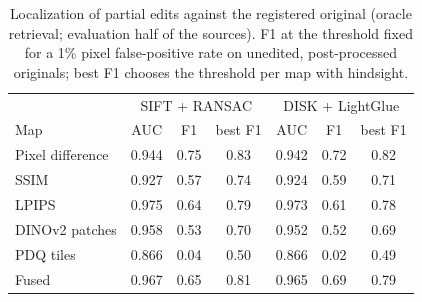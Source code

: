 \begin{table}[!t]
\centering
\footnotesize
\caption{Localization of partial edits against the registered original (oracle retrieval; evaluation half of the sources). F1 at the threshold fixed for a 1\% pixel false-positive rate on unedited, post-processed originals; best F1 chooses the threshold per map with hindsight.}
\label{tab:fp-loc}
\setlength{\tabcolsep}{3pt}
\begin{tabular}{lcccccc}
\toprule
 & \multicolumn{3}{c}{SIFT + RANSAC} & \multicolumn{3}{c}{DISK + LightGlue} \\
Map & AUC & F1 & best F1 & AUC & F1 & best F1 \\
\midrule
Pixel difference & 0.944 & 0.75 & 0.83 & 0.942 & 0.72 & 0.82 \\
SSIM & 0.927 & 0.57 & 0.74 & 0.924 & 0.59 & 0.71 \\
LPIPS & 0.975 & 0.64 & 0.79 & 0.973 & 0.61 & 0.78 \\
DINOv2 patches & 0.958 & 0.53 & 0.70 & 0.952 & 0.52 & 0.69 \\
PDQ tiles & 0.866 & 0.04 & 0.50 & 0.866 & 0.02 & 0.49 \\
Fused & 0.967 & 0.65 & 0.81 & 0.965 & 0.69 & 0.79 \\
\bottomrule
\end{tabular}

\end{table}
